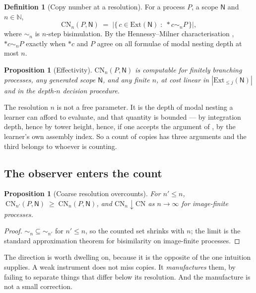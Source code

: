 \documentclass[11pt]{article}
\theoremstyle{plain}
\newtheorem{proposition}[theorem]{Proposition}
\theoremstyle{definition}
\newtheorem{definition}[theorem]{Definition}
\theoremstyle{remark}
\newcommand{\Nsp}{\mathsf{N}}
\newcommand{\drop}[1]{*#1}
\newcommand{\CN}{\mathrm{CN}}
\newcommand{\bisimn}[1]{\sim_{#1}}
\newcommand{\Ext}{\mathrm{Ext}}
\begin{document}
\begin{definition}[Copy number at a resolution]\label{sco:def:cnn}
For a process $P$, a scope $\Nsp$ and $n \in \mathbb{N}$,
\[
  \CN_n(P, \Nsp) \;=\;
  \bigl|\{\, c \in \Ext(\Nsp) \;:\; \drop{c} \bisimn{n} P \,\}\bigr|,
\]
where $\bisimn{n}$ is $n$-step bisimulation. By the Hennessy--Milner
characterisation \cite{HM}, $\drop{c} \bisimn{n} P$ exactly when $\drop{c}$
and $P$ agree on all formulae of modal nesting depth at most $n$.
\end{definition}

\begin{proposition}[Effectivity]\label{sco:prop:effective}
$\CN_n(P,\Nsp)$ is computable for finitely branching processes, any
generated scope $\Nsp$, and any finite $n$, at cost linear in
$|\Ext_{\le j}(\Nsp)|$ and in the depth-$n$ decision procedure.
\end{proposition}

The resolution $n$ is not a free parameter. It is the depth of modal
nesting a learner can afford to evaluate, and that quantity is bounded ---
by integration depth, hence by tower height, hence, if one accepts the
argument of \cite[Ch.~44]{book}, by the learner's own assembly index. So a
count of copies has three arguments and the third belongs to whoever is
counting.

\subsection{The observer enters the count}\label{sco:S4.2}

\begin{proposition}[Coarse resolution overcounts]\label{sco:prop:mono}
For $n' \le n$, $\ \CN_{n'}(P,\Nsp) \;\ge\; \CN_n(P,\Nsp)$, and
$\CN_n \downarrow \CN$ as $n \to \infty$ for image-finite processes.
\end{proposition}

\begin{proof}
$\bisimn{n} \subseteq \bisimn{n'}$ for $n' \le n$, so the counted set
shrinks with $n$; the limit is the standard approximation theorem for
bisimilarity on image-finite processes.
\end{proof}

The direction is worth dwelling on, because it is the opposite of the one
intuition supplies. A weak instrument does not miss copies. It
\emph{manufactures} them, by failing to separate things that differ below
its resolution. And the manufacture is not a small correction.
\end{document}
